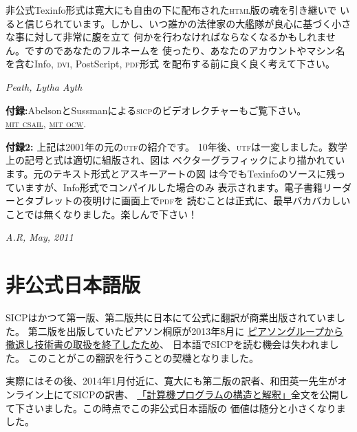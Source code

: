 \documentclass[oneside]{book}
\newcommand{\acronym}[1]{\textsc{\MakeLowercase{#1}}}
\begin{document}
非公式Texinfo形式は寛大にも自由の下に配布された\acronym{HTML}版の魂を引き継いで
いると信じられています。しかし、いつ誰かの法律家の大艦隊が良心に基づく小さな事に対して非常に腹を立て
何かを行わなければならなくなるかもしれません。ですのであなたのフルネームを
使ったり、あなたのアカウントやマシン名を含むInfo, \acronym{DVI}, PostScript, \acronym{PDF}形式
を配布する前に良く良く考えて下さい。

\noindent
\textit{Peath, Lytha Ayth}

\vspace{1.0em}
\noindent
\textbf{付録:}AbelsonとSussmanによる\acronym{SICP}のビデオレクチャーもご覧下さい。\\
\href{http://groups.csail.mit.edu/mac/classes/6.001/abelson-sussman-lectures/}{\acronym{MIT CSAIL}}, 
\href{http://ocw.mit.edu/courses/electrical-engineering-and-computer-science/6-001-structure-and-interpretation-of-computer-programs-spring-2005/video-lectures/}{\acronym{MIT OCW}}.

\vspace{0.5em}
\noindent 
\textbf{付録2:} 上記は2001年の元の\acronym{UTF}の紹介です。
10年後、\acronym{UTF}は一変しました。数学上の記号と式は適切に組版され、図は
ベクターグラフィックにより描かれています。元のテキスト形式とアスキーアートの図
は今でもTexinfoのソースに残っていますが、Info形式でコンパイルした場合のみ
表示されます。電子書籍リーダーとタブレットの夜明けに画面上で\acronym{PDF}を
読むことは正式に、最早バカバカしいことでは無くなりました。楽しんで下さい！

\vspace{0.5em}
\noindent
\textit{A.R, May, 2011}

\chapter*{非公式日本語版}
\label{Unofficail Japanese Edition}

SICPはかつて第一版、第二版共に日本にて公式に翻訳が商業出版されていました。
第二版を出版していたピアソン桐原が2013年8月に
\href{http://slashdot.jp/story/13/08/09/0517250/}{ピアソングループから撤退し技術書の取扱を終了したため}、
日本語でSICPを読む機会は失われました。
このことがこの翻訳を行うことの契機となりました。

実際にはその後、2014年1月付近に、寛大にも第二版の訳者、和田英一先生がオンライン上にてSICPの訳書、
\href{http://sicp.iijlab.net/}{「計算機プログラムの構造と解釈」}全文を公開して下さいました。この時点でこの非公式日本語版の
価値は随分と小さくなりました。
\end{document}
